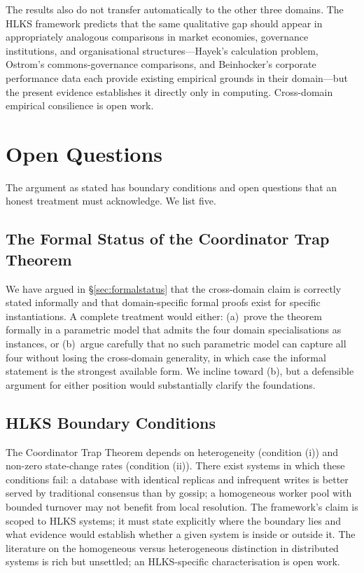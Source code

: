 \documentclass[11pt]{article}
\theoremstyle{definition}
\theoremstyle{plain}
\theoremstyle{plain}
\begin{document}
The results also do not transfer automatically to the other three domains.
The HLKS framework predicts that the same qualitative gap should appear in
appropriately analogous comparisons in market economies, governance
institutions, and organisational structures---Hayek's calculation problem,
Ostrom's commons-governance comparisons, and Beinhocker's corporate
performance data each provide existing empirical grounds in their
domain---but the present evidence establishes it directly only in
computing. Cross-domain empirical consilience is open work.

\section{Open Questions}
\label{sec:open}

The argument as stated has boundary conditions and open questions that an
honest treatment must acknowledge. We list five.

\subsection{The Formal Status of the Coordinator Trap Theorem}

We have argued in \S\ref{sec:formalstatus} that the cross-domain claim is
correctly stated informally and that domain-specific formal proofs exist for
specific instantiations. A complete treatment would either: (a)~prove the
theorem formally in a parametric model that admits the four domain
specialisations as instances, or (b)~argue carefully that no such parametric
model can capture all four without losing the cross-domain generality, in
which case the informal statement is the strongest available form. We
incline toward (b), but a defensible argument for either position would
substantially clarify the foundations.

\subsection{HLKS Boundary Conditions}

The Coordinator Trap Theorem depends on heterogeneity (condition (i)) and
non-zero state-change rates (condition (ii)). There exist systems in which
these conditions fail: a database with identical replicas and infrequent
writes is better served by traditional consensus than by gossip; a
homogeneous worker pool with bounded turnover may not benefit from local
resolution. The framework's claim is scoped to HLKS systems; it must state
explicitly where the boundary lies and what evidence would establish whether
a given system is inside or outside it. The literature on the homogeneous
versus heterogeneous distinction in distributed systems is rich but
unsettled; an HLKS-specific characterisation is open work.
\end{document}
